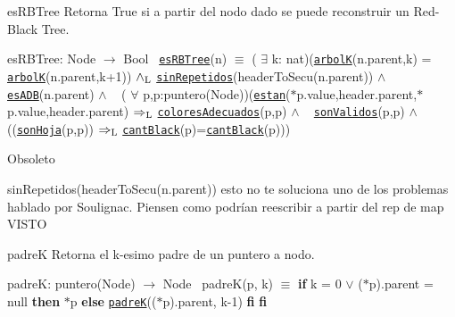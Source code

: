 \begin{DoxyParagraph}{es\+R\+B\+Tree}
Retorna True si a partir del nodo dado se puede reconstruir un Red-\/\+Black Tree.

es\+R\+B\+Tree\+: Node $\to$ Bool~\newline
 \href{axiomas.html#esRBTree}{\tt es\+R\+B\+Tree}(n) $\equiv$ ( $\exists$ k\+: nat)(\href{axiomas.html#arbolK}{\tt arbolK}(n.\+parent,k) = \href{axiomas.html#arbolK}{\tt arbolK}(n.\+parent,k+1)) $\land_{\rm L}$ \href{axiomas.html#sinRepetidos}{\tt sin\+Repetidos}(header\+To\+Secu(n.\+parent)) $\land$ \href{axiomas.html#esADB}{\tt es\+A\+DB}(n.\+parent) $\land$ ~\newline
 ( $\forall$ p,p\textquotesingle{}\+:puntero(\+Node))(\href{axiomas.html#estan}{\tt estan}($\ast$p.value,header.\+parent,$\ast$p\textquotesingle{}.value,header.\+parent) $\Rightarrow_{\rm L}$ \href{axiomas.html#coloresAdecuados}{\tt colores\+Adecuados}(p,p\textquotesingle{}) $\land$ ~\newline
 \href{axiomas.html#sonValidos}{\tt son\+Validos}(p,p\textquotesingle{}) $\land$ ((\href{axiomas.html#sonHoja}{\tt son\+Hoja}(p,p\textquotesingle{})) $\Rightarrow_{\rm L}$ \href{axiomas.html#cantBlack}{\tt cant\+Black}(p)=\href{axiomas.html#cantBlack}{\tt cant\+Black}(p\textquotesingle{}))) 
\end{DoxyParagraph}


\begin{DoxyRefDesc}{Obsoleto}
\item[\hyperlink{deprecated__deprecated000002}{Obsoleto}]sin\+Repetidos(header\+To\+Secu(n.\+parent)) esto no te soluciona uno de los problemas hablado por Soulignac. Piensen como podrían reescribir a partir del rep de map V\+I\+S\+TO\end{DoxyRefDesc}


\begin{DoxyParagraph}{padreK}
Retorna el k-\/esimo padre de un puntero a nodo.

padreK\+: puntero(\+Node) $\to$ Node~\newline
 padre\+K(p, k) $\equiv$ {\bfseries if} k = 0 $\lor$ ($\ast$p).parent = null {\bfseries then} $\ast$p {\bfseries else} \href{axiomas.html#padreK}{\tt padreK}(($\ast$p).parent, k-\/1) {\bfseries fi} {\bfseries fi} 
\end{DoxyParagraph}
